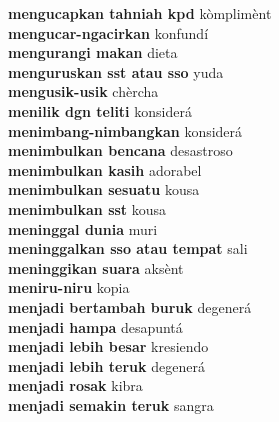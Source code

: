 \textbf{ mengucapkan tahniah kpd  } kòmplimènt \\
\textbf{ mengucar-ngacirkan  } konfundí \\
\textbf{ mengurangi makan  } dieta \\
\textbf{ menguruskan sst atau sso  } yuda \\
\textbf{ mengusik-usik  } chèrcha \\
\textbf{ menilik dgn teliti  } konsiderá \\
\textbf{ menimbang-nimbangkan  } konsiderá \\
\textbf{ menimbulkan bencana  } desastroso \\
\textbf{ menimbulkan kasih  } adorabel \\
\textbf{ menimbulkan sesuatu  } kousa \\
\textbf{ menimbulkan sst  } kousa \\
\textbf{ meninggal dunia  } muri \\
\textbf{ meninggalkan sso atau tempat  } sali \\
\textbf{ meninggikan suara  } aksènt \\
\textbf{ meniru-niru  } kopia \\
\textbf{ menjadi bertambah buruk  } degenerá \\
\textbf{ menjadi hampa  } desapuntá \\
\textbf{ menjadi lebih besar  } kresiendo \\
\textbf{ menjadi lebih teruk  } degenerá \\
\textbf{ menjadi rosak  } kibra \\
\textbf{ menjadi semakin teruk  } sangra \\
